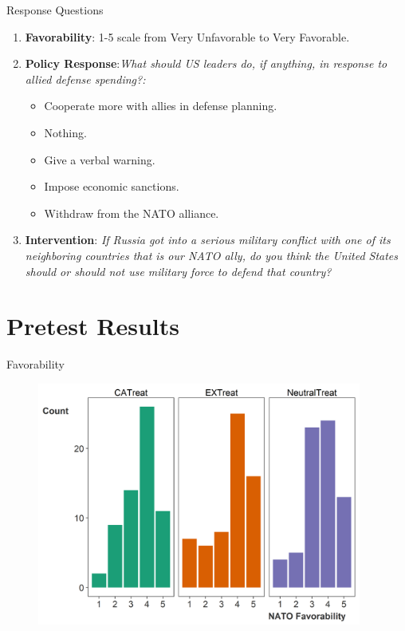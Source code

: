 \documentclass[12pt]{beamer}
\begin{document}
\begin{frame}{Response Questions}


\begin{enumerate}

\item \textbf{Favorability}: 1-5 scale from Very Unfavorable to Very Favorable.  
\pause 
\item \textbf{Policy Response}:\textit{What should US leaders do, if anything, in response to allied defense spending?:} 
\begin{itemize}
\item Cooperate more with allies in defense planning.
\item Nothing. 
\item Give a verbal warning.
\item Impose economic sanctions.
\item Withdraw from the NATO alliance. 
\end{itemize} 
\pause 
\item \textbf{Intervention}: \textit{If Russia got into a serious military conflict with one of its neighboring countries that is our NATO ally, do you think the United States should or should not use military force to defend that country?}
 
\end{enumerate} 

\end{frame} 




\section{Pretest Results} 



\begin{frame}{Favorability}

\begin{figure}[htbp]
	\centering
		\includegraphics[width=0.95\textwidth]{raw-favor.png}
\end{figure}


\end{frame}
\end{document}

